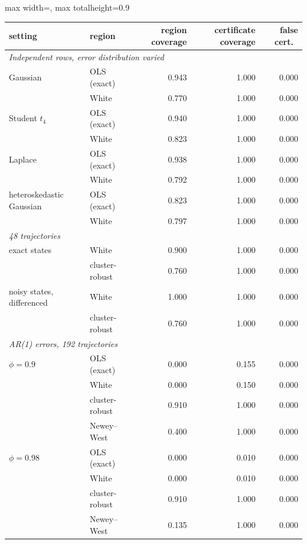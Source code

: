 \begin{table}[!tbp]
\centering\small
\begin{adjustbox}{max width=\textwidth, max totalheight=0.9\textheight}
\begin{tabular}{llrrr}
\toprule
setting & region & region coverage & certificate coverage & false cert.\ \\
\midrule
\multicolumn{5}{l}{\emph{Independent rows, error distribution varied}} \\
Gaussian & OLS (exact) & 0.943 & 1.000 & 0.000 \\
 & White & 0.770 & 1.000 & 0.000 \\
Student $t_4$ & OLS (exact) & 0.940 & 1.000 & 0.000 \\
 & White & 0.823 & 1.000 & 0.000 \\
Laplace & OLS (exact) & 0.938 & 1.000 & 0.000 \\
 & White & 0.792 & 1.000 & 0.000 \\
heteroskedastic Gaussian & OLS (exact) & 0.823 & 1.000 & 0.000 \\
 & White & 0.797 & 1.000 & 0.000 \\
\midrule
\multicolumn{5}{l}{\emph{48 trajectories}} \\
exact states & White & 0.900 & 1.000 & 0.000 \\
 & cluster-robust & 0.760 & 1.000 & 0.000 \\
noisy states, differenced & White & 1.000 & 1.000 & 0.000 \\
 & cluster-robust & 0.760 & 1.000 & 0.000 \\
\midrule
\multicolumn{5}{l}{\emph{AR(1) errors, 192 trajectories}} \\
$\phi = 0.9$ & OLS (exact) & 0.000 & 0.155 & 0.000 \\
 & White & 0.000 & 0.150 & 0.000 \\
 & cluster-robust & 0.910 & 1.000 & 0.000 \\
 & Newey--West & 0.400 & 1.000 & 0.000 \\
$\phi = 0.98$ & OLS (exact) & 0.000 & 0.010 & 0.000 \\
 & White & 0.000 & 0.010 & 0.000 \\
 & cluster-robust & 0.910 & 1.000 & 0.000 \\
 & Newey--West & 0.135 & 1.000 & 0.000 \\
\bottomrule
\end{tabular}
\end{adjustbox}

\end{table}
